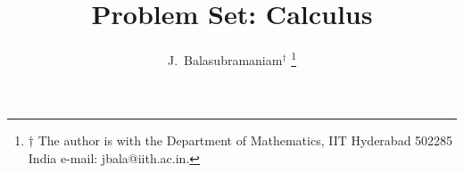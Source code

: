 \documentclass[journal,12pt,onecolumn]{IEEEtran}
\begin{document}
\providecommand{\nCr}[2]{\,^{#1}C_{#2}} %
\providecommand{\nPr}[2]{\,^{#1}P_{#2}} %
\providecommand{\mbf}{\mathbf}
\providecommand{\pr}[1]{\ensuremath{\Pr\left(#1\right)}}
\providecommand{\qfunc}[1]{\ensuremath{Q\left(#1\right)}}
\providecommand{\sbrak}[1]{\ensuremath{{}\left[#1\right]}}
\providecommand{\lsbrak}[1]{\ensuremath{{}\left[#1\right.}}
\providecommand{\rsbrak}[1]{\ensuremath{{}\left.#1\right]}}
\providecommand{\brak}[1]{\ensuremath{\left(#1\right)}}
\providecommand{\lbrak}[1]{\ensuremath{\left(#1\right.}}
\providecommand{\rbrak}[1]{\ensuremath{\left.#1\right)}}
\providecommand{\cbrak}[1]{\ensuremath{\left\{#1\right\}}}
\providecommand{\lcbrak}[1]{\ensuremath{\left\{#1\right.}}
\providecommand{\rcbrak}[1]{\ensuremath{\left.#1\right\}}}
\newcommand{\sgn}{\mathop{\mathrm{sgn}}}
\providecommand{\abs}[1]{\left\vert#1\right\vert}
\providecommand{\res}[1]{\Res\displaylimits_{#1}} 
\providecommand{\norm}[1]{\lVert#1\rVert}
\providecommand{\mtx}[1]{\mathbf{#1}}
\providecommand{\mean}[1]{E\left[ #1 \right]}
\providecommand{\fourier}{\overset{\mathcal{F}}{ \rightleftharpoons}}
\providecommand{\hilbert}{\overset{\mathcal{H}}{ \rightleftharpoons}}
\providecommand{\system}{\overset{\mathcal{H}}{ \longleftrightarrow}}

\newcommand{\solution}{\noindent \textbf{Solution: }}
\providecommand{\dec}[2]{\ensuremath{\overset{#1}{\underset{#2}{\gtrless}}}}
\title{ 
Problem Set: Calculus
}
\author{J.~Balasubramaniam$^{\dagger}$ %
\thanks{$\dagger$ The author is with the Department of Mathematics, IIT Hyderabad
502285 India e-mail: jbala@iith.ac.in. }
}
\maketitle
\end{document}
